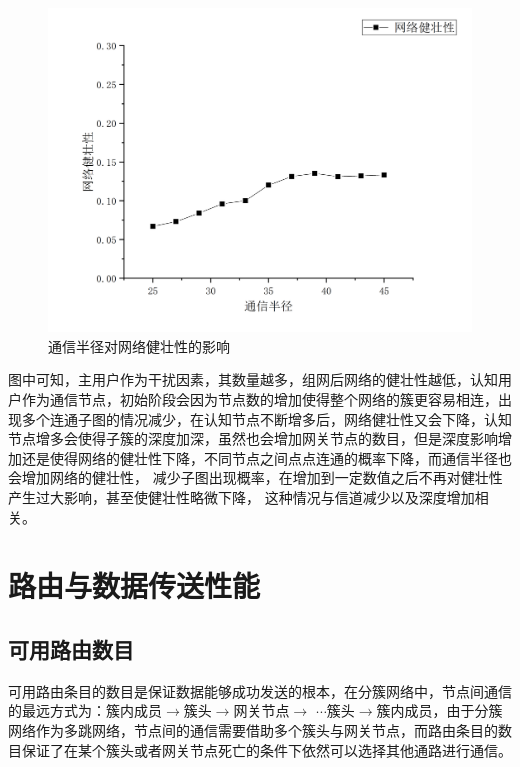 \documentclass[a4paper,AutoFakeBold,oneside,12pt]{book}
\begin{document}
\begin{figure}[htbp]
\centering %
\includegraphics[scale=0.3]{pictures/R-STRONG.png} 
\caption{通信半径对网络健壮性的影响} %
\label{R-STRONG}
\end{figure}
  图中可知，主用户作为干扰因素，其数量越多，组网后网络的健壮性越低，认知用户作为通信节点，初始阶段会因为节点数的增加使得整个网络的簇更容易相连，出现多个连通子图的情况减少，在认知节点不断增多后，网络健壮性又会下降，认知节点增多会使得子簇的深度加深，虽然也会增加网关节点的数目，但是深度影响增加还是使得网络的健壮性下降，不同节点之间点点连通的概率下降，而通信半径也会增加网络的健壮性， 减少子图出现概率，在增加到一定数值之后不再对健壮性产生过大影响，甚至使健壮性略微下降， 这种情况与信道减少以及深度增加相关。
 \section{路由与数据传送性能}
  \subsection{可用路由数目}
  可用路由条目的数目是保证数据能够成功发送的根本，在分簇网络中，节点间通信的最远方式为：簇内成员$\to$簇头$\to$网关节点$\to$ $\cdots$簇头$\to$簇内成员，由于分簇网络作为多跳网络，节点间的通信需要借助多个簇头与网关节点，而路由条目的数目保证了在某个簇头或者网关节点死亡的条件下依然可以选择其他通路进行通信。
  
\end{document}
